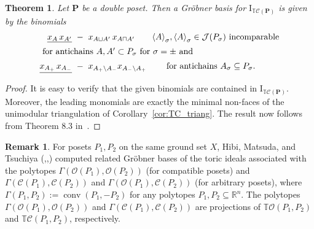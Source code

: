 \documentclass[11pt]{amsart}
\newtheorem{thm}{Theorem}[section]
\theoremstyle{definition}
\newtheorem{rem}{Remark}
\begin{document}
\begin{thm}\label{thm:TC_GB}
    Let ${\mathbf{P}}$ be a double poset. Then a Gr\"obner basis for
    ${{\mathrm{I}}_{{{\mathbb{T}}{\mathcal{C}({{{\mathbf{P}}}})}}}}$ is given by the binomials
    \begin{align*}
        \underline{x_A \, x_{A'}} \ &- \ 
        x_{A \sqcup A'}\, x_{A \sqcap A'} \qquad {\langle {A} \rangle}_\sigma,
        {\langle {A} \rangle}_\sigma \in {{\mathcal{J}}({{P}_\sigma})} \text{ incomparable}\\
        \intertext{ for antichains $A,A' \subset {P}_\sigma$ for $\sigma = \pm$
        and }
        \underline{x_{A_+} \, x_{A_-}} \ &- \ x_{A_+ \setminus
        A_-}x_{A_-\setminus A_+}
        \qquad \text{ for antichains } A_\sigma \subseteq {P}_\sigma.
    \end{align*}
\end{thm}
\begin{proof}
    It is easy to verify that the given binomials are contained in
    ${{\mathrm{I}}_{{{\mathbb{T}}{\mathcal{C}({{{\mathbf{P}}}})}}}}$. Moreover, the leading monomials are exactly the minimal
    non-faces of the unimodular triangulation of Corollary~\ref{cor:TC_triang}.
    The result now follows from Theorem 8.3 in~\cite{Sturmfels96}.
\end{proof}

\begin{rem}
    For posets ${P}_1,{P}_2$ on the same ground set $X$, Hibi, Matsuda, and
    Tsuchiya (\cite{Hibi15-1},\cite{Hibi15-2},\cite{Hibi15-3}) computed
    related Gr\"obner bases of the toric ideals associated with the polytopes
    $\Gamma({\mathcal{O}({{P}_1})},{\mathcal{O}({{P}_2})})$ (for compatible posets) and
    $\Gamma({\mathcal{C}({{{P}_1}})},{\mathcal{C}({{{P}_2}})})$ and  $\Gamma({\mathcal{O}({{P}_1})},{\mathcal{C}({{{P}_2}})})$
    (for arbitrary posets), where $\Gamma(P_1,P_2):=\operatorname{conv}(P_1,-P_2)$ for any
    polytopes $P_1,P_2\subseteq{\mathbb{R}}^n$. The polytopes
    $\Gamma({\mathcal{O}({{P}_1})},{\mathcal{O}({{P}_2})})$ and $\Gamma({\mathcal{C}({{{P}_1}})},{\mathcal{C}({{{P}_2}})})$
    are projections of ${{\mathbb{T}}{\mathcal{O}({{{P}_1,{P}_2}})}}$ and ${{\mathbb{T}}{\mathcal{C}({{{{P}_1,{P}_2}}})}}$,
    respectively.
\end{rem} 



\end{document}
